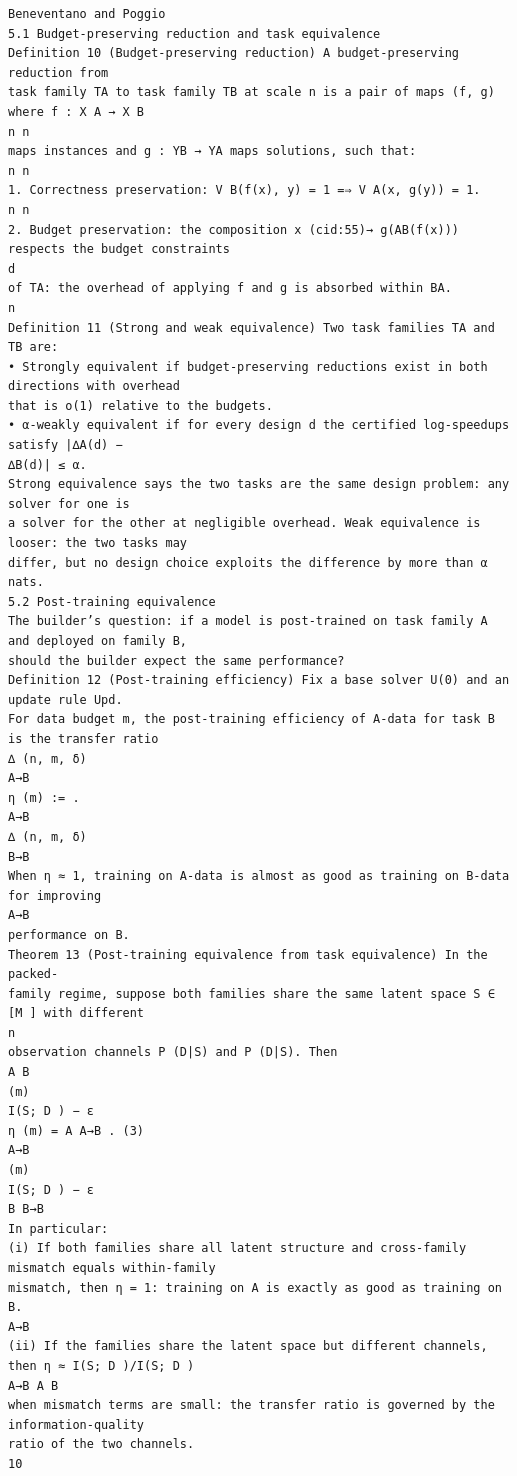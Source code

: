 \documentclass[11pt]{article}
\begin{document}
\begin{verbatim}
Beneventano and Poggio
5.1 Budget-preserving reduction and task equivalence
Definition 10 (Budget-preserving reduction) A budget-preserving reduction from
task family TA to task family TB at scale n is a pair of maps (f, g) where f : X A → X B
n n
maps instances and g : YB → YA maps solutions, such that:
n n
1. Correctness preservation: V B(f(x), y) = 1 =⇒ V A(x, g(y)) = 1.
n n
2. Budget preservation: the composition x (cid:55)→ g(AB(f(x))) respects the budget constraints
d
of TA: the overhead of applying f and g is absorbed within BA.
n
Definition 11 (Strong and weak equivalence) Two task families TA and TB are:
• Strongly equivalent if budget-preserving reductions exist in both directions with overhead
that is o(1) relative to the budgets.
• α-weakly equivalent if for every design d the certified log-speedups satisfy |∆A(d) −
∆B(d)| ≤ α.
Strong equivalence says the two tasks are the same design problem: any solver for one is
a solver for the other at negligible overhead. Weak equivalence is looser: the two tasks may
differ, but no design choice exploits the difference by more than α nats.
5.2 Post-training equivalence
The builder’s question: if a model is post-trained on task family A and deployed on family B,
should the builder expect the same performance?
Definition 12 (Post-training efficiency) Fix a base solver U(0) and an update rule Upd.
For data budget m, the post-training efficiency of A-data for task B is the transfer ratio
∆ (n, m, δ)
A→B
η (m) := .
A→B
∆ (n, m, δ)
B→B
When η ≈ 1, training on A-data is almost as good as training on B-data for improving
A→B
performance on B.
Theorem 13 (Post-training equivalence from task equivalence) In the packed-
family regime, suppose both families share the same latent space S ∈ [M ] with different
n
observation channels P (D|S) and P (D|S). Then
A B
(m)
I(S; D ) − ε
η (m) = A A→B . (3)
A→B
(m)
I(S; D ) − ε
B B→B
In particular:
(i) If both families share all latent structure and cross-family mismatch equals within-family
mismatch, then η = 1: training on A is exactly as good as training on B.
A→B
(ii) If the families share the latent space but different channels, then η ≈ I(S; D )/I(S; D )
A→B A B
when mismatch terms are small: the transfer ratio is governed by the information-quality
ratio of the two channels.
10
\end{verbatim}

\clearpage
\end{document}
